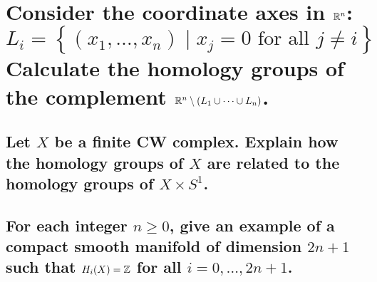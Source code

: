 \documentclass[10pt]{article}
\begin{document}
\section{Consider the coordinate axes in $\mathbb{R}^n$:
  $$L_i = \left\{ (x_1, \dots, x_n) \mid x_j =0 \mbox{ for all } j \neq i \right\} $$
  Calculate the homology groups of the complement $\mathbb{R}^n \setminus (L_1 \cup \cdots \cup
  L_n)$.}

\advsection{}

\subsection{Let $X$ be a finite CW complex. Explain how the homology groups of $X$ are related to
  the homology groups of $X \times S^1$.}

\subsection{For each integer $n \geq 0$, give an example of a compact smooth manifold of dimension
  $2n +1$ such that $H_i(X) = \mathbb{Z}$ for all $i = 0,\dots, 2n+1$.}
\end{document}
